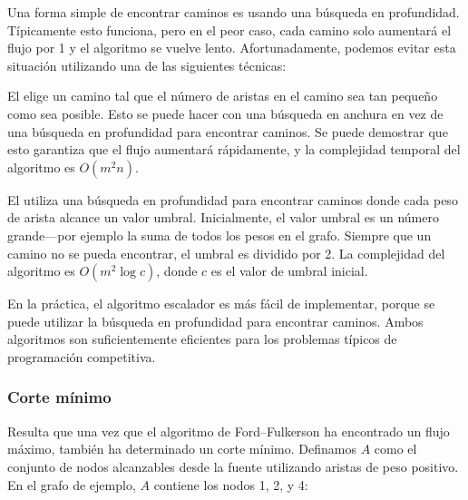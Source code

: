 Una forma simple de encontrar caminos es usando una búsqueda en
profundidad. Típicamente esto funciona, pero en el peor caso,
cada camino solo aumentará el flujo por 1 y el algoritmo se vuelve lento.
Afortunadamente, podemos evitar esta situación utilizando una de las
siguientes técnicas:


El  \cite{edm72} elige un camino tal
que el número de aristas en el camino sea tan pequeño como sea posible.
Esto se puede hacer con una búsqueda en anchura en vez de una búsqueda
en profundidad para encontrar caminos. Se puede demostrar que esto
garantiza que el flujo aumentará rápidamente, y la complejidad temporal
del algoritmo es $O(m^2 n)$.


El  \cite{ahu91} utiliza una búsqueda en
profundidad para encontrar caminos donde cada peso de arista alcance
un valor umbral. Inicialmente, el valor umbral es un número
grande---por ejemplo la suma de todos los pesos en el grafo. Siempre
que un camino no se pueda encontrar, el umbral es dividido por 2. La
complejidad del algoritmo es $O(m^2 \log c)$, donde $c$ es el valor
de umbral inicial.

En la práctica, el algoritmo escalador es más fácil de implementar,
porque se puede utilizar la búsqueda en profundidad para encontrar
caminos. Ambos algoritmos son suficientemente eficientes para
los problemas típicos de programación competitiva.

\subsubsection{Corte mínimo}


Resulta que una vez que el algoritmo de Ford--Fulkerson ha encontrado
un flujo máximo, también ha determinado un corte mínimo. Definamos
$A$ como el conjunto de nodos alcanzables desde la fuente utilizando
aristas de peso positivo. En el grafo de ejemplo, $A$ contiene los nodos
1, 2, y 4:

